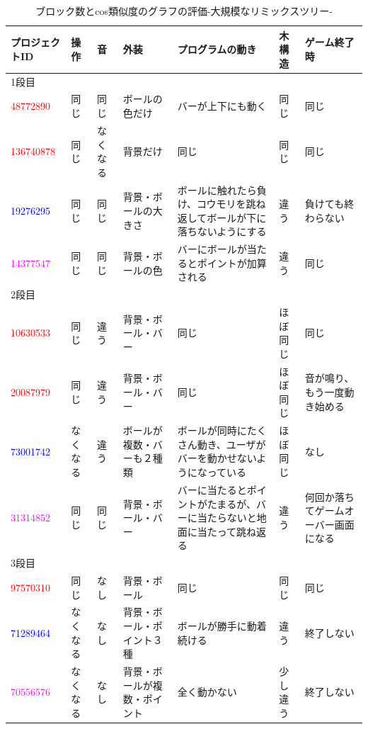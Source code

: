 \documentclass[a4paper,10pt,onecolumn,oneside,openany]{jsbook}
\begin{document}
\begin{table}[h]
 \scriptsize
 \caption{ブロック数とcos類似度のグラフの評価-大規模なリミックスツリー-}
 \label{block}
 \begin{center}
\begin{tabular}{|p{1.7cm}||p{1cm}|p{1cm}|p{1.7cm}|p{2cm}|p{1cm}|p{1.7cm}|} \hline

プロジェクトID & 操作 & 音 & 外装 & プログラムの動き & 木構造 & ゲーム終了時 \\ \hline \hline
1段目 &  &  &  &  &  &  \\ \hline
\textcolor{red}{48772890} & 同じ & 同じ & ボールの色だけ & バーが上下にも動く & 同じ & 同じ \\ \hline
\textcolor{red}{136740878} & 同じ & なくなる & 背景だけ & 同じ & 同じ & 同じ \\ \hline
\textcolor{blue}{19276295} & 同じ & 同じ & 背景・ボールの大きさ & ボールに触れたら負け、コウモリを跳ね返してボールが下に落ちないようにする & 違う & 負けても終わらない \\ \hline
\textcolor{magenta}{14377547} & 同じ & 同じ & 背景・ボールの色 & バーにボールが当たるとポイントが加算される & 違う & 同じ \\ \hline

2段目 &  &  &  &  &  &  \\ \hline
\textcolor{red}{10630533} & 同じ & 違う & 背景・ボール・バー & 同じ & ほぼ同じ & 同じ \\ \hline
\textcolor{red}{20087979} & 同じ & 違う & 背景・ボール・バー & 同じ & ほぼ同じ & 音が鳴り、もう一度動き始める \\ \hline
\textcolor{blue}{73001742} & なくなる & 違う & ボールが複数・バーも２種類 & ボールが同時にたくさん動き、ユーザがバーを動かせないようになっている & ほぼ同じ & なし \\ \hline
\textcolor{magenta}{31314852} & 同じ & 同じ & 背景・ボール・バー & バーに当たるとポイントがたまるが、バーに当たらないと地面に当たって跳ね返る & 違う & 何回か落ちてゲームオーバー画面になる \\ \hline

3段目 &  &  &  &  &  &  \\ \hline
\textcolor{red}{97570310} & 同じ & なし & 背景・ボール & 同じ & 同じ & 同じ \\ \hline
\textcolor{blue}{71289464} & なくなる & なし & 背景・ボール・ポイント３種 & ボールが勝手に動着続ける & 違う & 終了しない \\ \hline
\textcolor{magenta}{70556576} & なくなる & なし & 背景・ボールが複数・ポイント & 全く動かない & 少し違う & 終了しない \\ \hline


\end{tabular}
\end{center}
\end{table}
\end{document}
